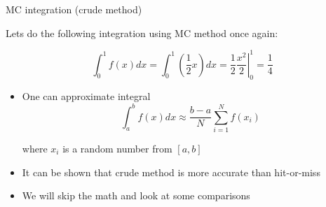 \begin{slide}[toc=Crude method]{MC integration (crude method)}
\null\vfill

  Lets do the following integration using MC method once again:
  
  $$\int_0^1 f(x)dx = \int_0^1 \left(\frac{1}{2}x\right) dx = \left.\frac{1}{2}\frac{x^2}{2}\right|_{0}^{1} = \frac{1}{4}$$
  \twocolumn
  {
    \begin{itemize}
      \item One can approximate integral
      \vspace{-5pt}
      $$\int_a^b f(x) dx \approx \frac{b - a}{N}\sum_{i=1}^{N} f(x_i)$$
     
      where $x_i$ is a random number from $[a, b]$
      
      \item It can be shown that crude method is more accurate than hit-or-miss
      
      \item We will skip the math and look at some comparisons
      
    \end{itemize}
  }
  {
    
  }

\vfill\null
\end{slide}

